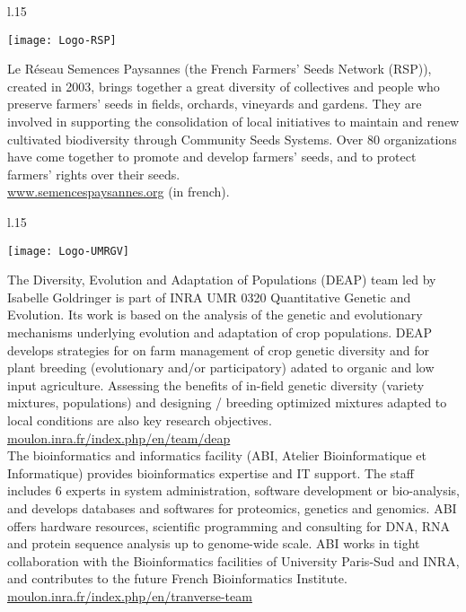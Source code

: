 \begin{wrapfigure}{l}{.15\textwidth}
\begin{center} \vspace{-20pt}
\texttt{[image: Logo-RSP]}
\end{center} \vspace{-20pt}
\end{wrapfigure}
\noindent
Le Réseau Semences Paysannes (the French Farmers' Seeds Network (RSP)), created in 2003, brings together a great diversity of collectives and people who preserve farmers' seeds in fields, orchards, vineyards and gardens. They are involved in supporting the consolidation of local initiatives to maintain and renew cultivated biodiversity through Community Seeds Systems. Over 80 organizations have come together to promote and develop farmers' seeds, and to protect farmers' rights over their seeds. \\
\url{www.semencespaysannes.org} (in french).


\vfill

\begin{wrapfigure}{l}{.15\textwidth}
\begin{center} \vspace{-20pt}
\texttt{[image: Logo-UMRGV]}
\end{center} \vspace{-20pt}
\end{wrapfigure}
\noindent
The Diversity, Evolution and Adaptation of Populations (DEAP) team led by Isabelle Goldringer is part of INRA UMR 0320 Quantitative Genetic and Evolution.
Its work is based on the analysis of the genetic and evolutionary mechanisms underlying evolution and adaptation of crop populations.
DEAP develops strategies for on farm management of crop genetic diversity and
for plant breeding (evolutionary and/or participatory) adated to organic and low input agriculture.
Assessing the benefits of in-field genetic diversity (variety mixtures, populations) and designing
/ breeding optimized mixtures adapted to local conditions are also key research objectives.\\
\url{moulon.inra.fr/index.php/en/team/deap} \\
\noindent
The bioinformatics and informatics facility (ABI, Atelier Bioinformatique et Informatique) provides bioinformatics expertise and IT support. The staff includes 6 experts in system administration, software development or bio-analysis, and develops databases and softwares for proteomics, genetics and genomics. ABI offers hardware resources, scientific programming and consulting for DNA, RNA and protein sequence analysis up to genome-wide scale. ABI works in tight collaboration with the Bioinformatics facilities of University Paris-Sud and INRA, and contributes to the future French Bioinformatics Institute. \\
\url{moulon.inra.fr/index.php/en/tranverse-team} \\


